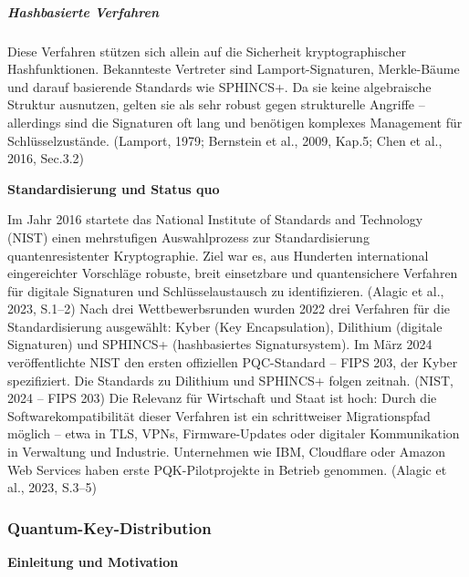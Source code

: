 \subparagraph{Hashbasierte Verfahren}
Diese Verfahren stützen sich allein auf die Sicherheit kryptographischer Hashfunktionen. Bekannteste Vertreter sind Lamport-Signaturen, Merkle-Bäume und darauf basierende Standards wie SPHINCS+. Da sie keine algebraische Struktur ausnutzen, gelten sie als sehr robust gegen strukturelle Angriffe – allerdings sind die Signaturen oft lang und benötigen komplexes Management für Schlüsselzustände.
 (Lamport, 1979; Bernstein et al., 2009, Kap.5; Chen et al., 2016, Sec.3.2)


\vspace{1em}
\noindent\textbf{Standardisierung und Status quo}

\noindent
Im Jahr 2016 startete das National Institute of Standards and Technology (NIST) einen mehrstufigen Auswahlprozess zur Standardisierung quantenresistenter Kryptographie. Ziel war es, aus Hunderten international eingereichter Vorschläge robuste, breit einsetzbare und quantensichere Verfahren für digitale Signaturen und Schlüsselaustausch zu identifizieren.
 (Alagic et al., 2023, S.1–2)
Nach drei Wettbewerbsrunden wurden 2022 drei Verfahren für die Standardisierung ausgewählt: Kyber (Key Encapsulation), Dilithium (digitale Signaturen) und SPHINCS+ (hashbasiertes Signatursystem). Im März 2024 veröffentlichte NIST den ersten offiziellen PQC-Standard – FIPS 203, der Kyber spezifiziert. Die Standards zu Dilithium und SPHINCS+ folgen zeitnah.
 (NIST, 2024 – FIPS 203)
Die Relevanz für Wirtschaft und Staat ist hoch: Durch die Softwarekompatibilität dieser Verfahren ist ein schrittweiser Migrationspfad möglich – etwa in TLS, VPNs, Firmware-Updates oder digitaler Kommunikation in Verwaltung und Industrie. Unternehmen wie IBM, Cloudflare oder Amazon Web Services haben erste PQK-Pilotprojekte in Betrieb genommen.
 (Alagic et al., 2023, S.3–5)
 

\subsubsection{Quantum-Key-Distribution}
\noindent\textbf{Einleitung und Motivation}

